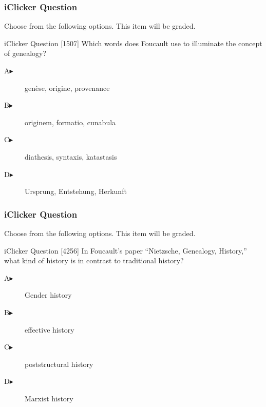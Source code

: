 \documentclass[xcolor=dvipsnames]{beamer}
\begin{document}
\begin{frame}
  \frametitle{iClicker Question}
Choose from the following options. This item will be graded.
\begin{block}{iClicker Question}
[1507] Which words does Foucault use to illuminate the concept of genealogy?
\end{block}
\begin{description}
\item[A\hspace{.2in}$\blacktriangleright$] gen{\`e}se, origine, provenance
\item[B\hspace{.2in}$\blacktriangleright$] originem, formatio, cunabula
\item[C\hspace{.2in}$\blacktriangleright$] diathesis, syntaxis, katastasis
\item[D\hspace{.2in}$\blacktriangleright$] Ursprung, Entstehung, Herkunft
\end{description}
\end{frame}

\begin{frame}
  \frametitle{iClicker Question}
Choose from the following options. This item will be graded.
\begin{block}{iClicker Question}
[4256] In Foucault's paper ``Nietzsche, Genealogy, History,'' what kind of history is in contrast to traditional history?
\end{block}
\begin{description}
\item[A\hspace{.2in}$\blacktriangleright$] Gender history
\item[B\hspace{.2in}$\blacktriangleright$] effective history
\item[C\hspace{.2in}$\blacktriangleright$] poststructural history
\item[D\hspace{.2in}$\blacktriangleright$] Marxist history
\end{description}
\end{frame}
\end{document}
